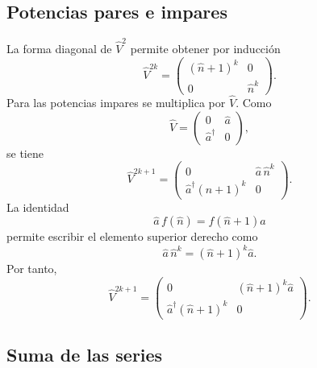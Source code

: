 \documentclass[11pt]{article}
\newcommand{\adag}{\hat a^\dagger}
\newcommand{\nnop}{\hat n}
\begin{document}
\subsection{Potencias pares e impares}

La forma diagonal de $\hat V^2$ permite obtener por inducci\'on
\begin{equation}
  \hat V^{2k}
  =
  \begin{pmatrix}
    (\nnop+1)^k & 0\\
    0 & \nnop^k
  \end{pmatrix}.
\end{equation}
Para las potencias impares se multiplica por $\hat V$. Como
\begin{equation}
  \hat V
  =
  \begin{pmatrix}
    0 & \hat a\\
    \adag & 0
  \end{pmatrix},
\end{equation}
se tiene
\begin{equation}
  \hat V^{2k+1}
  =
  \begin{pmatrix}
    0 & \hat a\,\nnop^k\\
    \adag(\nnop+1)^k & 0
  \end{pmatrix}.
\end{equation}
La identidad
\begin{equation}
  \hat a\,f(\nnop)=f(\nnop+1)\hat a
\end{equation}
permite escribir el elemento superior derecho como
\begin{equation}
  \hat a\,\nnop^k=(\nnop+1)^k\hat a.
\end{equation}
Por tanto,
\begin{equation}
  \hat V^{2k+1}
  =
  \begin{pmatrix}
    0 & (\nnop+1)^k\hat a\\
    \adag(\nnop+1)^k & 0
  \end{pmatrix}.
\end{equation}

\subsection{Suma de las series}
\end{document}
